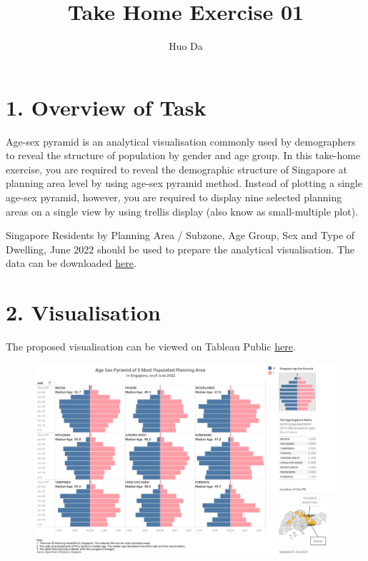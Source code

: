 \documentclass[
  letterpaper,
  DIV=11,
  numbers=noendperiod,
  oneside]{scrartcl}
\title{Take Home Exercise 01}
\author{Huo Da}
\date{}
\begin{document}
\maketitle
\ifdefined\Shaded\renewenvironment{Shaded}{\begin{tcolorbox}[frame hidden, borderline west={3pt}{0pt}{shadecolor}, breakable, interior hidden, boxrule=0pt, sharp corners, enhanced]}{\end{tcolorbox}}\fi

\hypertarget{overview-of-task}{%
\section{1. Overview of Task}\label{overview-of-task}}

Age-sex pyramid is an analytical visualisation commonly used by
demographers to reveal the structure of population by gender and age
group. In this take-home exercise, you are required to reveal the
demographic structure of Singapore at planning area level by using
age-sex pyramid method. Instead of plotting a single age-sex pyramid,
however, you are required to display nine selected planning areas on a
single view by using trellis display (also know as small-multiple plot).

Singapore Residents by Planning Area / Subzone, Age Group, Sex and Type
of Dwelling, June 2022 should be used to prepare the analytical
visualisation. The data can be downloaded
\href{https://www.singstat.gov.sg/find-data/search-by-theme/population/geographic-distribution/latest-data}{here}.

\hypertarget{visualisation}{%
\section{2. Visualisation}\label{visualisation}}

The proposed visualisation can be viewed on Tableau Public
\href{https://public.tableau.com/app/profile/huoda1027/viz/TakeHome_Ex01_16742612602400/Dashboard1?publish=yes}{here}.

\begin{figure}

{\centering \includegraphics{images/vis-02.jpg}

}

\end{figure}
\end{document}
